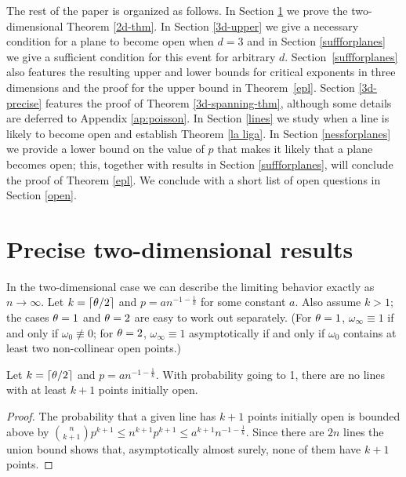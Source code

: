 The rest of the paper is organized as follows. In Section \ref{2d} we 
prove the two-dimensional Theorem \ref{2d-thm}. 
In Section \ref{3d-upper} we give a necessary condition for a plane to become  
open when $d=3$ and in Section \ref{suffforplanes} we give a sufficient condition 
for this event for arbitrary $d$. Section~\ref{suffforplanes} also features the resulting upper
and lower bounds for critical exponents in three dimensions and the proof for the upper bound in Theorem~\ref{epl}.  Section \ref{3d-precise}
features the proof of Theorem \ref{3d-spanning-thm}, although some details are 
deferred to Appendix \ref{ap:poisson}.
In Section \ref{lines} we study when a line is likely to become open
and establish Theorem \ref{la liga}. In Section
\ref{nessforplanes} we provide a lower bound on the value of $p$ that makes
it likely that a plane becomes open; this, together with results in Section \ref{suffforplanes}, 
will conclude the proof of Theorem \ref{epl}.
We conclude with a short list of open questions in Section \ref{open}. 

\section{Precise two-dimensional results}
\label{2d}
In the two-dimensional case we can describe the limiting behavior exactly as $n \to \infty$. Let $k = \lceil \theta/2\rceil$ and $p = an^{-1-\frac{1}{k}}$ for some constant $a$. Also assume $k > 1$; the cases $\theta=1$ and $\theta=2$ are easy to work out separately. (For $\theta=1$, $\omega_\infty \equiv 1$ if and only if $\omega_0 \not\equiv 0$; for $\theta=2$, $\omega_\infty \equiv 1$ asymptotically if and only if $\omega_0$ contains at least two non-collinear open points.)

\begin{lemma} \label{overlines}
Let $k = \lceil \theta/2\rceil$ and $p = an^{-1-\frac{1}{k}}$. With probability going to 1, there are no lines with at least $k+1$ points initially open.
\end{lemma}
\begin{proof}
The probability that a given line has $k+1$ points initially open is bounded
above by ${n \choose {k+1}}p^{k+1} \le n^{k+1}p^{k+1}\le a^{k+1}n^{-1-\frac{1}{k}}$. Since
there are $2n$ lines the union bound shows that, asymptotically almost surely, 
none of them have $k+1$ points.
\end{proof}

